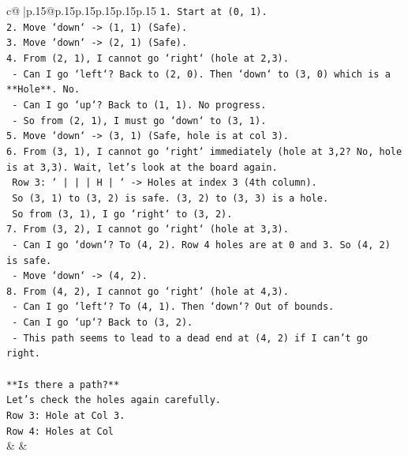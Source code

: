 \documentclass{article}
\begin{document}
{\begin{supertabular}{c@{$\;$}|p{.15\linewidth}@{}p{.15\linewidth}p{.15\linewidth}p{.15\linewidth}p{.15\linewidth}p{.15\linewidth}}
{{{\texttt{1.  Start at (0, 1).} \\
\texttt{2.  Move `down` {-}> (1, 1) (Safe).} \\
\texttt{3.  Move `down` {-}> (2, 1) (Safe).} \\
\texttt{4.  From (2, 1), I cannot go `right` (hole at 2,3).} \\
\texttt{    {-} Can I go `left`? Back to (2, 0). Then `down` to (3, 0) which is a **Hole**. No.} \\
\texttt{    {-} Can I go `up`? Back to (1, 1). No progress.} \\
\texttt{    {-} So from (2, 1), I must go `down` to (3, 1).} \\
\texttt{5.  Move `down` {-}> (3, 1) (Safe, hole is at col 3).} \\
\texttt{6.  From (3, 1), I cannot go `right` immediately (hole at 3,2? No, hole is at 3,3). Wait, let's look at the board again.} \\
\texttt{    Row 3: ` | | | H | ` {-}> Holes at index 3 (4th column).} \\
\texttt{    So (3, 1) to (3, 2) is safe. (3, 2) to (3, 3) is a hole.} \\
\texttt{    So from (3, 1), I go `right` to (3, 2).} \\
\texttt{7.  From (3, 2), I cannot go `right` (hole at 3,3).} \\
\texttt{    {-} Can I go `down`? To (4, 2). Row 4 holes are at 0 and 3. So (4, 2) is safe.} \\
\texttt{    {-} Move `down` {-}> (4, 2).} \\
\texttt{8.  From (4, 2), I cannot go `right` (hole at 4,3).} \\
\texttt{    {-} Can I go `left`? To (4, 1). Then `down`? Out of bounds.} \\
\texttt{    {-} Can I go `up`? Back to (3, 2).} \\
\texttt{    {-} This path seems to lead to a dead end at (4, 2) if I can't go right.} \\
\\ 
\texttt{**Is there a path?**} \\
\texttt{Let's check the holes again carefully.} \\
\texttt{Row 3: Hole at Col 3.} \\
\texttt{Row 4: Holes at Col} \\
            }
        }
    }
    & & \\ \\


\end{supertabular}}
\end{document}
